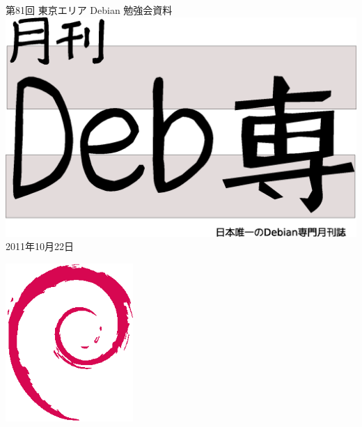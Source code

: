 \documentclass[mingoth,a4paper]{jsarticle}
\newcommand{\debmtgyear}{2011}
\newcommand{\debmtgmonth}{10}
\newcommand{\debmtgdate}{22}
\newcommand{\debmtgnumber}{81}
\begin{document}
\begin{titlepage}
\thispagestyle{empty}

\vspace*{-2cm}
第\debmtgnumber{}回 東京エリア Debian 勉強会資料\\
\hspace*{-2cm}
\includegraphics[width=210mm]{image201003/debsen.eps}\\
\hfill{}\debmtgyear{}年\debmtgmonth{}月\debmtgdate{}日



\vspace*{-2cm}
\hfill{}\includegraphics[height=6cm]{image200502/openlogo-nd.eps}
\end{titlepage}

\end{document}
